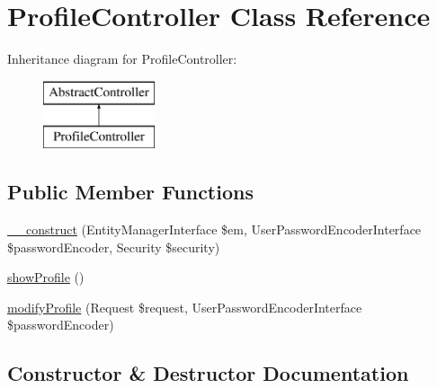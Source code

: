 \hypertarget{class_app_1_1_controller_1_1_profile_controller}{}\section{Profile\+Controller Class Reference}
\label{class_app_1_1_controller_1_1_profile_controller}
Inheritance diagram for Profile\+Controller\+:\begin{figure}[H]
\begin{center}
\leavevmode
\includegraphics[height=2.000000cm]{class_app_1_1_controller_1_1_profile_controller}
\end{center}
\end{figure}
\subsection*{Public Member Functions}
\begin{DoxyCompactItemize}
\item 
\mbox{\hyperlink{class_app_1_1_controller_1_1_profile_controller_ae28176433f83e09a14690e80861647ea}{\+\_\+\+\_\+construct}} (Entity\+Manager\+Interface \$em, User\+Password\+Encoder\+Interface \$password\+Encoder, Security \$security)
\item 
\mbox{\hyperlink{class_app_1_1_controller_1_1_profile_controller_af97f08fadd4db4ce24ed2f880866a531}{show\+Profile}} ()
\item 
\mbox{\hyperlink{class_app_1_1_controller_1_1_profile_controller_a3c7cab7627f4f48611e9b5182266ae61}{modify\+Profile}} (Request \$request, User\+Password\+Encoder\+Interface \$password\+Encoder)
\end{DoxyCompactItemize}


\subsection{Constructor \& Destructor Documentation}
\mbox{\label{class_app_1_1_controller_1_1_profile_controller_ae28176433f83e09a14690e80861647ea}} 
